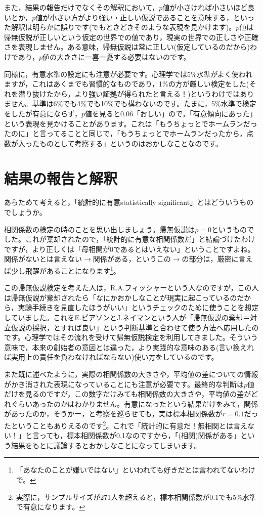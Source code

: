 \documentclass{ltjsbook}
\begin{document}
また，結果の報告だけでなくその解釈において，$p$値が小さければ小さいほど良いとか，$p$値が小さい方がより強い・正しい仮説であることを意味する，といった解釈は明らかに誤りです(でもときどきそのような表現を見かけます)。$p$値は帰無仮説が正しいという仮定の世界での値であり，現実の世界での正しさや正確さを表現しません。ある意味，帰無仮説は常に正しい(仮定しているのだから)わけであり，$p$値の大きさに一喜一憂する必要はないのです。

同様に，有意水準の設定にも注意が必要です。心理学では5\%水準がよく使われますが，これはあくまでも習慣的なものであり，1\%の方が厳しい検定をした(それを潜り抜けたから，より強い証拠が得られたと言える！)というわけではありません。基準は6\%でも4\%でも10\%でも構わないのです。たまに，5\%水準で検定をしたが有意にならず，$p$値を見ると0.06「おしい」ので，「有意傾向にあった」という表現を見かけることがあります。これは「もうちょっとでホームランだったのに」と言ってることと同じで，「もうちょっとでホームランだったから，点数が入ったものとして考察する」というのはおかしなことなのです。

\section{結果の報告と解釈}
\label{sec:14_01}

あらためて考えると，「統計的に有意statistically significant」とはどういうものでしょうか。

相関係数の検定の時のことを思い出しましょう。帰無仮説は$\rho=0$というものでした。これが棄却されたので，「統計的に有意な相関係数だ」と結論づけたわけですが，より正しくは「母相関が0であるとはいえない」ということですよね。関係がないとは言えない$\to$関係がある，というこの$\to$の部分は，厳密に言えば少し飛躍があることになります\footnote{「あなたのことが嫌いではない」といわれても好きだとは言われてないわけで。}。

この帰無仮説検定を考えた人は，R.A.フィッシャーという人なのですが，この人は帰無仮説が棄却されたら「なにかおかしなことが現実に起こっているのだから，実験手続きを見直したほうがいい」というチェックのために使うことを想定していました。これをE.ピアソンとJ.ネイマンという人が「帰無仮説の棄却＝対立仮説の採択，とすれば良い」という判断基準と合わせて使う方法へ応用したのです。心理学ではその流れを受けて帰無仮説検定を利用してきました。そういう意味で，本来の創始者の意図とは違った，より実践的な意味のある(言い換えれば実用上の責任を負わなければならない)使い方をしているのです。

また既に述べたように，実際の相関係数の大きさや，平均値の差についての情報がかき消された表現になっていることにも注意が必要です。最終的な判断は$p$値だけを見るのですが，この数字だけみても相関係数の大きさや，平均値の差がどれぐらいあったのかはわかりません。有意になったという結果だけをみて，関係があったのか，そうかー，と考察を巡らせても，実は標本相関係数が$r=0.1$だったということもありえるのです\footnote{実際に，サンプルサイズが271人を超えると，標本相関係数が$0.1$でも5\%水準で有意になります。}。これで「統計的に有意だ！無相関とは言えない！」と言っても，標本相関係数が0.1なのですから，「(相関)関係がある」という結果をもとに議論するとおかしなことになってしまいます。
\end{document}
